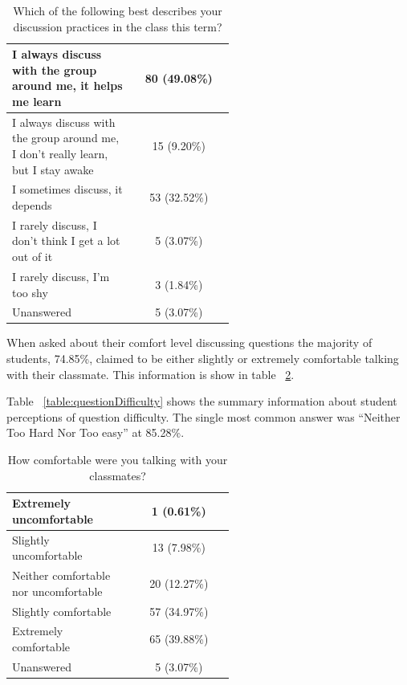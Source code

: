 \documentclass[12pt]{article}
\begin{document}
\begin{table}[ht]
\label{table:groupDiscussion}
\begin{tabular}{p{0.55\linewidth}|c} %
\toprule
 \rowcolor{LightGray}  %
 I always discuss with the group around me, it helps me learn & 80 (49.08\%)\\\midrule 
 I always discuss with the group around me, I don't really learn, but I stay awake & 15 (9.20\%)\\\midrule 
 \rowcolor{LightGray}
 I sometimes discuss, it depends & 53 (32.52\%)\\\midrule 
 I rarely discuss, I don't think I get a lot out of it & 5 (3.07\%)\\\midrule 
 \rowcolor{LightGray}
 I rarely discuss, I'm too shy & 3 (1.84\%)\\\midrule 
 Unanswered & 5 (3.07\%)\\\bottomrule 
\end{tabular}
\caption{Which of the following best describes your discussion practices in the class this term?}
\end{table}

When asked about their comfort level discussing questions the majority of students, 74.85\%, claimed to be either slightly or extremely comfortable talking with their classmate. This information is show in table ~\ref{table:group_comfort}.

Table ~\ref{table:questionDifficulty} shows the summary information about student perceptions of question difficulty. The single most common answer was ``Neither Too Hard Nor Too easy'' at 85.28\%. 


\begin{table}[ht]
\label{table:group_comfort}
\begin{tabular}{p{0.55\linewidth}|c} %
\toprule
 \rowcolor{LightGray} 
 Extremely uncomfortable & 1 (0.61\%)\\\midrule 
 Slightly uncomfortable & 13 (7.98\%)\\\midrule 
 \rowcolor{LightGray}
 Neither comfortable nor uncomfortable & 20 (12.27\%)\\\midrule 
 Slightly comfortable & 57 (34.97\%)\\\midrule 
 \rowcolor{LightGray}
 Extremely comfortable & 65 (39.88\%)\\\midrule 
 Unanswered & 5 (3.07\%)\\\bottomrule 
\end{tabular}
\caption{How comfortable were you talking with your classmates?}
\end{table}
\end{document}
